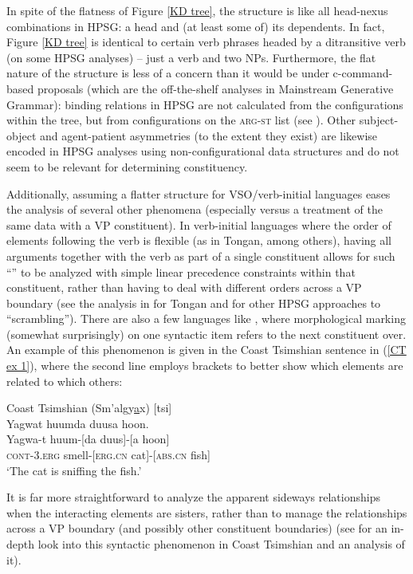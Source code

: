 \documentclass[output=paper
	        ,collection
	        ,collectionchapter
 	        ,biblatex
                ,babelshorthands
                ,newtxmath
                ,draftmode
                ,colorlinks, citecolor=brown
]{langscibook}
\begin{document}
In spite of the flatness of Figure \ref{KD tree}, the structure is like all head-nexus combinations in HPSG: a head and (at least some of) its dependents. In fact, Figure \ref{KD tree} is identical to certain verb phrases headed by a ditransitive verb (on some HPSG analyses) -- just a verb and two NPs. Furthermore, the flat nature of the structure is less of a concern than it would be under c-command-based proposals (which are the off-the-shelf analyses in Mainstream Generative Grammar): binding relations in HPSG are not calculated from the configurations within the tree, but from configurations on the \textsc{arg-st} list (see ). Other subject-object and agent-patient asymmetries (to the extent they exist) are likewise encoded in HPSG analyses using non-configurational data structures and do not seem to be relevant for determining constituency.

Additionally, assuming a flatter structure for VSO/verb-initial languages eases the analysis of several other phenomena (especially versus a treatment of the same data with a VP constituent). In verb-initial languages where the order of elements following the verb is flexible (as in Tongan, among others), having all arguments together with the verb as part of a single constituent allows for such ``'' to be analyzed with simple linear precedence constraints within that constituent, rather than having to deal with different orders across a VP boundary (see the analysis in \citealt[Chapter 3]{ball08thesis} for Tongan and  for other HPSG approaches to ``scrambling''). There are also a few languages like , where morphological marking (somewhat surprisingly) on one syntactic item refers to the next constituent over. An example of this phenomenon is given in the Coast Tsimshian sentence in (\ref{CT ex 1}), where the second line employs brackets to better show which elements are related to which others:        
%
\begin{samepage}
\begin{exe}
\ex\label{CT ex 1} Coast Tsimshian (Sm'algy\underline{a}x) [tsi] \citep[32]{mulder94} \\
 Yagwat huumda duusa hoon. \\
\gll Yagwa-t huum-[da duus]-[a hoon] \\
 \textsc{cont}-\textsc{3.erg} smell-[\textsc{erg.cn} cat]-[\textsc{abs.cn} fish] \\
\trans `The cat is sniffing the fish.' 
\end{exe}
\end{samepage}
%
It is far more straightforward to analyze the apparent sideways relationships when the interacting elements are sisters, rather than to manage the relationships across a VP boundary (and possibly other constituent boundaries) (see \citealt{ball11} for an in-depth look into this syntactic phenomenon in Coast Tsimshian and an analysis of it).  
\end{document}
